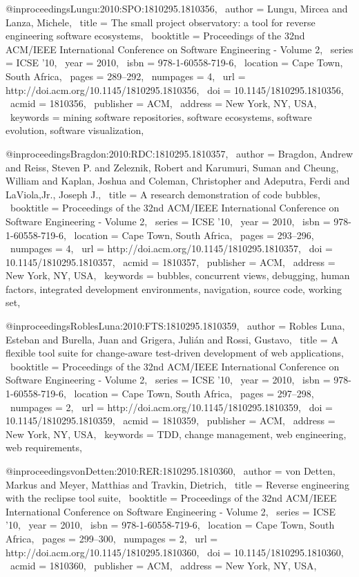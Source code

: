 @inproceedings{Lungu:2010:SPO:1810295.1810356,
 author = {Lungu, Mircea and Lanza, Michele},
 title = {The small project observatory: a tool for reverse engineering software ecosystems},
 booktitle = {Proceedings of the 32nd ACM/IEEE International Conference on Software Engineering - Volume 2},
 series = {ICSE '10},
 year = {2010},
 isbn = {978-1-60558-719-6},
 location = {Cape Town, South Africa},
 pages = {289--292},
 numpages = {4},
 url = {http://doi.acm.org/10.1145/1810295.1810356},
 doi = {10.1145/1810295.1810356},
 acmid = {1810356},
 publisher = {ACM},
 address = {New York, NY, USA},
 keywords = {mining software repositories, software ecosystems, software evolution, software visualization},
} 

@inproceedings{Bragdon:2010:RDC:1810295.1810357,
 author = {Bragdon, Andrew and Reiss, Steven P. and Zeleznik, Robert and Karumuri, Suman and Cheung, William and Kaplan, Joshua and Coleman, Christopher and Adeputra, Ferdi and LaViola,Jr., Joseph J.},
 title = {A research demonstration of code bubbles},
 booktitle = {Proceedings of the 32nd ACM/IEEE International Conference on Software Engineering - Volume 2},
 series = {ICSE '10},
 year = {2010},
 isbn = {978-1-60558-719-6},
 location = {Cape Town, South Africa},
 pages = {293--296},
 numpages = {4},
 url = {http://doi.acm.org/10.1145/1810295.1810357},
 doi = {10.1145/1810295.1810357},
 acmid = {1810357},
 publisher = {ACM},
 address = {New York, NY, USA},
 keywords = {bubbles, concurrent views, debugging, human factors, integrated development environments, navigation, source code, working set},
} 

@inproceedings{RoblesLuna:2010:FTS:1810295.1810359,
 author = {Robles Luna, Esteban and Burella, Juan and Grigera, Juli\'{a}n and Rossi, Gustavo},
 title = {A flexible tool suite for change-aware test-driven development of web applications},
 booktitle = {Proceedings of the 32nd ACM/IEEE International Conference on Software Engineering - Volume 2},
 series = {ICSE '10},
 year = {2010},
 isbn = {978-1-60558-719-6},
 location = {Cape Town, South Africa},
 pages = {297--298},
 numpages = {2},
 url = {http://doi.acm.org/10.1145/1810295.1810359},
 doi = {10.1145/1810295.1810359},
 acmid = {1810359},
 publisher = {ACM},
 address = {New York, NY, USA},
 keywords = {TDD, change management, web engineering, web requirements},
} 

@inproceedings{vonDetten:2010:RER:1810295.1810360,
 author = {von Detten, Markus and Meyer, Matthias and Travkin, Dietrich},
 title = {Reverse engineering with the reclipse tool suite},
 booktitle = {Proceedings of the 32nd ACM/IEEE International Conference on Software Engineering - Volume 2},
 series = {ICSE '10},
 year = {2010},
 isbn = {978-1-60558-719-6},
 location = {Cape Town, South Africa},
 pages = {299--300},
 numpages = {2},
 url = {http://doi.acm.org/10.1145/1810295.1810360},
 doi = {10.1145/1810295.1810360},
 acmid = {1810360},
 publisher = {ACM},
 address = {New York, NY, USA},
} 

